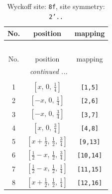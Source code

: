 \documentclass[fleqn,8pt]{jsarticle}
\begin{document}
\begin{longtable}{ccc}
\caption{Wyckoff site: {\tt 8f}, site symmetry: {\tt 2'..}}
 \\
 \hline \hline
No. & position & mapping \\ \hline \endfirsthead

\multicolumn{2}{l}{\tablename\ \thetable{}} \\
 \hline \hline
No. & position & mapping \\ \hline \endhead

 \hline \hline
\multicolumn{2}{r}{\footnotesize\it continued ...} \\ \endfoot

 \hline \hline
\multicolumn{2}{r}{} \\ \endlastfoot

1 & $\left[ x,\, 0,\, \frac{1}{4} \right]$ & {\tt [1,5]} \\ \hline
2 & $\left[ - x,\, 0,\, \frac{1}{4} \right]$ & {\tt [2,6]} \\ \hline
3 & $\left[ - x,\, 0,\, \frac{3}{4} \right]$ & {\tt [3,7]} \\ \hline
4 & $\left[ x,\, 0,\, \frac{3}{4} \right]$ & {\tt [4,8]} \\ \hline
5 & $\left[ x + \frac{1}{2},\, \frac{1}{2},\, \frac{3}{4} \right]$ & {\tt [9,13]} \\ \hline
6 & $\left[ \frac{1}{2} - x,\, \frac{1}{2},\, \frac{3}{4} \right]$ & {\tt [10,14]} \\ \hline
7 & $\left[ \frac{1}{2} - x,\, \frac{1}{2},\, \frac{1}{4} \right]$ & {\tt [11,15]} \\ \hline
8 & $\left[ x + \frac{1}{2},\, \frac{1}{2},\, \frac{1}{4} \right]$ & {\tt [12,16]} \\
\end{longtable}
\renewcommand{\arraystretch}{1.2}
\end{document}
